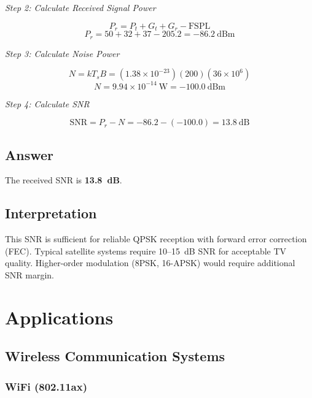 \textit{Step 2: Calculate Received Signal Power}

\begin{equation}
P_r = P_t + G_t + G_r - \mathrm{FSPL}
\end{equation}
\begin{equation}
P_r = 50 + 32 + 37 - 205.2 = -86.2~\text{dBm}
\end{equation}

\textit{Step 3: Calculate Noise Power}

\begin{equation}
N = kT_sB = (1.38 \times 10^{-23})(200)(36 \times 10^6)
\end{equation}
\begin{equation}
N = 9.94 \times 10^{-14}~\text{W} = -100.0~\text{dBm}
\end{equation}

\textit{Step 4: Calculate SNR}

\begin{equation}
\mathrm{SNR} = P_r - N = -86.2 - (-100.0) = 13.8~\text{dB}
\end{equation}

\subsection*{Answer}

The received SNR is \textbf{13.8~dB}.

\subsection*{Interpretation}

This SNR is sufficient for reliable QPSK reception with forward error correction (FEC). Typical satellite systems require 10--15~dB SNR for acceptable TV quality. Higher-order modulation (8PSK, 16-APSK) would require additional SNR margin.

\section{Applications}

\subsection{Wireless Communication Systems}

\subsubsection{WiFi (802.11ax)}

